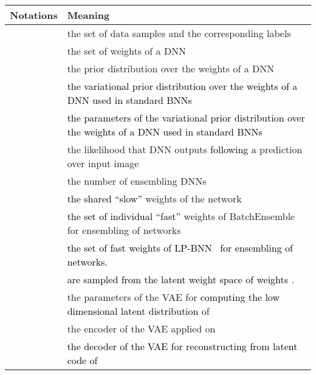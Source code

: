 \documentclass[10pt,twocolumn,letterpaper]{article}
\newcommand\emi{\textcolor{black}}
\newcommand\Gianni{\textcolor{black}}
\newcommand{\ab}[1]{\textcolor{black}{#1}}
\newcommand{\method}{LP-BNN\xspace}
\begin{document}
\begin{table*}[!t]
\renewcommand{\figurename}{Table}
\renewcommand{\captionfont}{\small}
\centering
\scalebox{0.90}
{
\begin{tabular}{ll}
\toprule
\textbf{Notations}                      & \textbf{Meaning}  \\ 
\midrule
 & the set of  data samples and the corresponding labels \\ 
\midrule
                      & the set of weights of a DNN            \\ \midrule
& the prior distribution over the weights of a DNN    \\ 
\midrule
\Gianni{}& \Gianni{the variational prior distribution over the weights of a DNN used in standard BNNs}\ab{~\cite{blundell2015weight}}   
\\ 
\midrule
\Gianni{}& \ab{the parameters of the variational prior distribution over the weights of a DNN used in standard BNNs~\cite{blundell2015weight}
}   \\ 
\midrule
     & the likelihood that DNN outputs  \emi{following a} prediction over input image    \\ 
\midrule
   & the number of ensembling DNNs  \\ 
\midrule
\ab{}   & \ab{the shared ``slow''} weights of the network   \\ 
\midrule
  & \ab{the set of individual ``fast''} weights of BatchEnsemble for ensembling of  networks \\
\midrule
     & \ab{the  set of fast weights of \method~ for ensembling of  networks.} \\ &  \ab{ are sampled from the latent weight space of weights .} \\
\midrule
   & the parameters of the VAE for \ab{computing the low dimensional latent distribution} of   \\ \midrule
\ab{} & the encoder of the VAE applied on   \\ \midrule
\ab{} &  \ab{the decoder of the VAE for reconstructing  from latent code of } \\ \midrule 
 

\end{tabular}}
\end{table*}
\end{document}
